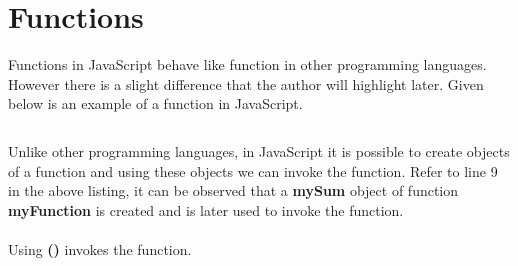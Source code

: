 \documentclass[twoside,12pt]{report}  %
\begin{document}
	
	\chapter{Functions}
	
	\noindent Functions in JavaScript behave like function in other programming languages. However there is a slight difference that the author will highlight later. Given below is an example of a function in JavaScript.
	
	\begin{listing}[H]
		\inputminted[linenos, autogobble, bgcolor=myjsbackground]{JavaScript}{../codes/js_functions.js}
	\end{listing}
	
	\noindent Unlike other programming languages, in JavaScript it is possible to create objects of a function and using these objects we can invoke the function. Refer to line 9 in the above listing, it can be observed that a \textbf{mySum} object of function \textbf{myFunction} is created and is later used to invoke the function.
	\\
	\\
	Using \textbf{()} invokes the function.
	
	
	
	
\end{document}
